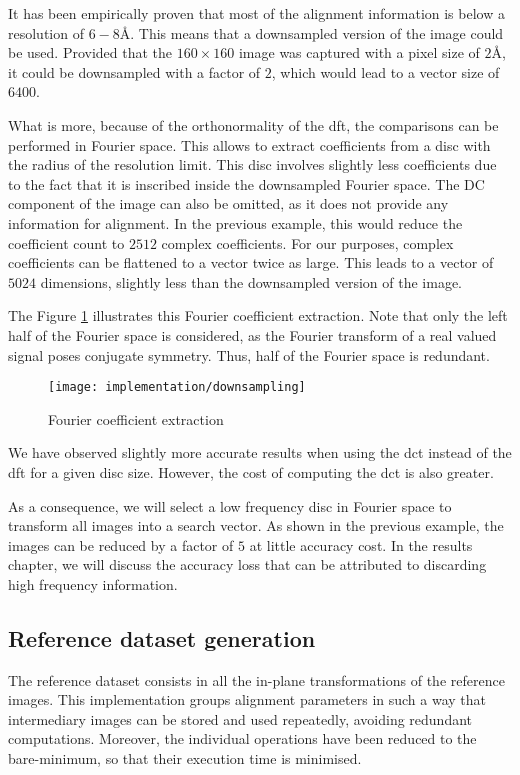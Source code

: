 \documentclass[../main.tex]{subfiles}
\begin{document}
It has been empirically proven that most of the alignment information is below a resolution of $6-8 \si{\angstrom}$\cite{scheres2021}. This means that a downsampled version of the image could be used. Provided that the $160\times160$ image was captured with a pixel size of $2 \si{\angstrom}$, it could be downsampled with a factor of $2$, which would lead to a vector size of $6400$. 

What is more, because of the orthonormality of the \gls{dft}, the comparisons can be performed in Fourier space. This allows to extract coefficients from a disc with the radius of the resolution limit. This disc involves slightly less coefficients due to the fact that it is inscribed inside the downsampled Fourier space. The DC component of the image can also be omitted, as it does not provide any information for alignment. In the previous example, this would reduce the coefficient count to $2512$ complex coefficients. For our purposes, complex coefficients can be flattened to a vector twice as large. This leads to a vector of $5024$ dimensions, slightly less than the downsampled version of the image.

The Figure \ref{fig:4:downsampling} illustrates this Fourier coefficient extraction. Note that only the left half of the Fourier space is considered, as the Fourier transform of a real valued signal poses conjugate symmetry. Thus, half of the Fourier space is redundant. 

\begin{figure}[htbp]
    \centering
    \texttt{[image: implementation/downsampling]}
    \caption{Fourier coefficient extraction}
    \label{fig:4:downsampling}
\end{figure}

We have observed slightly more accurate results when using the \gls{dct} instead of the \gls{dft} for a given disc size. However, the cost of computing the \gls{dct} is also greater.

As a consequence, we will select a low frequency disc in Fourier space to transform all images into a search vector. As shown in the previous example, the images can be reduced by a factor of $5$ at little accuracy cost. In the results chapter, we will discuss the accuracy loss that can be attributed to discarding high frequency information.

\subsection{Reference dataset generation}
The reference dataset consists in all the in-plane transformations of the reference images. This implementation groups alignment parameters in such a way that intermediary images can be stored and used repeatedly, avoiding redundant computations. Moreover, the individual operations have been reduced to the bare-minimum, so that their execution time is minimised.
\end{document}
